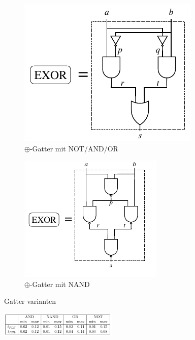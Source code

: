 \documentclass{scrartcl}[9pt, a4paper]
\begin{document}
\begin{figure}[h]
	\begin{subfigure}[b]{.5\textwidth}
		\centering
		\includegraphics[width=.65\linewidth]{figs/xor3}
		\caption{$\oplus$-Gatter mit NOT/AND/OR}
		\label{notandor}
	\end{subfigure}%
	\begin{subfigure}[b]{.5\textwidth}
		\centering
		\includegraphics[width=.65\linewidth]{figs/xor2}
		\caption{$\oplus$-Gatter mit NAND}
		\label{nand}
	\end{subfigure}%
	\caption{Gatter varianten}
\end{figure}

\begin{figure}[h]
	\centering
	\includegraphics[width=0.5\textwidth]{figs/timings}
	\label{oplus4}
\end{figure}


\end{document}
